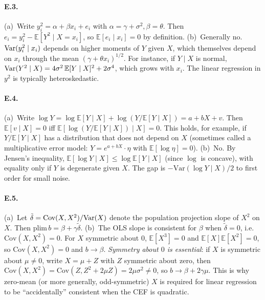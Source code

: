 \documentclass{article}
\newcommand{\E}{\mathbb{E}}
\begin{document}
\paragraph{E.3.}  (a)~Write $y_i^2 = \alpha + \beta x_i + e_i$ with $\alpha = \gamma + \sigma^2, \beta = \theta$.  Then $e_i = y_i^2 - \E[Y^2\mid X = x_i]$, so $\E[e_i \mid x_i] = 0$ by definition.  (b)~Generally no.  $\mbox{Var}(y_i^2\mid x_i)$ depends on higher moments of $Y$ given $X$, which themselves depend on $x_i$ through the mean $(\gamma + \theta x_i)^{1/2}$.  For instance, if $Y \mid X$ is normal, $\Var(Y^2\mid X) = 4\sigma^2\,\E[Y\mid X]^2 + 2\sigma^4$, which grows with $x_i$.  The linear regression in $y^2$ is typically heteroskedastic.

\paragraph{E.4.}  (a)~Write $\log Y = \log\E[Y\mid X] + \log(Y/\E[Y\mid X]) = a + bX + v$.  Then $\E[v\mid X] = 0$ iff $\E[\log(Y/\E[Y\mid X])\mid X] = 0$.  This holds, for example, if $Y/\E[Y\mid X]$ has a distribution that does not depend on $X$ (sometimes called a multiplicative error model: $Y = e^{a+bX}\cdot \eta$ with $\E[\log\eta] = 0$).  (b)~No.  By Jensen's inequality, $\E[\log Y \mid X] \leq \log\E[Y\mid X]$ (since $\log$ is concave), with equality only if $Y$ is degenerate given $X$.  The gap is $-\text{Var}(\log Y\mid X)/2$ to first order for small noise.

\paragraph{E.5.}  (a)~Let $\tilde\delta = \text{Cov}(X, X^2)/\mbox{Var}(X)$ denote the population projection slope of $X^2$ on $X$.  Then $\text{plim}\,b = \beta + \gamma\tilde\delta$.  (b)~The OLS slope is consistent for $\beta$ when $\tilde\delta = 0$, i.e.\ $\text{Cov}(X, X^2) = 0$.  For $X$ symmetric about $0$, $\E[X^3] = 0$ and $\E[X]\E[X^2] = 0$, so $\text{Cov}(X, X^2) = 0$ and $b \to \beta$.  \emph{Symmetry about $0$ is essential}: if $X$ is symmetric about $\mu \neq 0$, write $X = \mu + Z$ with $Z$ symmetric about zero, then $\text{Cov}(X, X^2) = \text{Cov}(Z, Z^2 + 2\mu Z) = 2\mu\sigma^2 \neq 0$, so $b \to \beta + 2\gamma\mu$.  This is why zero-mean (or more generally, odd-symmetric) $X$ is required for linear regression to be ``accidentally'' consistent when the CEF is quadratic.
\end{document}
